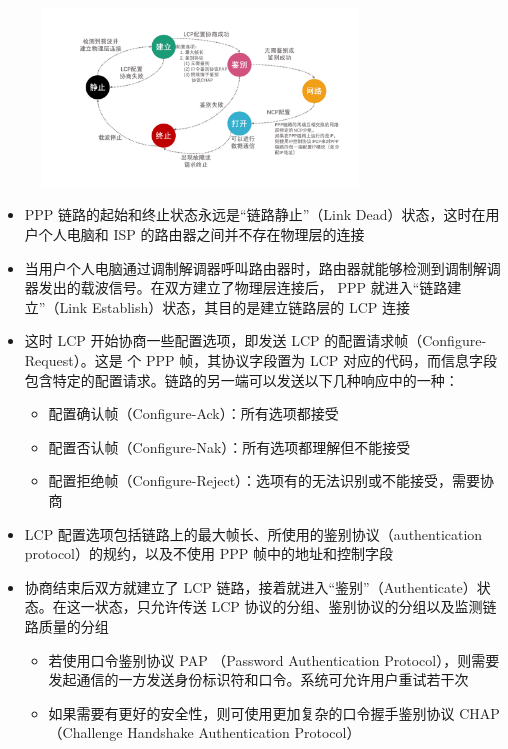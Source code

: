 \documentclass[cs4size,a4paper,10pt]{ctexart}
\begin{document}
	\begin{figure}[H]
		\centering
		\includegraphics[width=0.75\textwidth]{img/3.3.3}
	\end{figure}

	\begin{itemize}
		\item PPP 链路的起始和终止状态永远是“链路静止”（Link Dead）状态，这时在用户个人电脑和 ISP 的路由器之间并不存在物理层的连接
		\item 当用户个人电脑通过调制解调器呼叫路由器时，路由器就能够检测到调制解调器发出的载波信号。在双方建立了物理层连接后， PPP 就进入“链路建立”（Link Establish）状态，其目的是建立链路层的 LCP 连接
		\item 这时 LCP 开始协商一些配置选项，即发送 LCP 的配置请求帧（Configure-Request）。这是 个 PPP 帧，其协议字段置为 LCP 对应的代码，而信息字段包含特定的配置请求。链路的另一端可以发送以下几种响应中的一种：
		\begin{itemize}
			\item 配置确认帧（Configure-Ack）：所有选项都接受
			\item 配置否认帧（Configure-Nak）：所有选项都理解但不能接受
			\item 配置拒绝帧（Configure-Reject）：选项有的无法识别或不能接受，需要协商
		\end{itemize}
		\item LCP 配置选项包括链路上的最大帧长、所使用的鉴别协议（authentication protocol）的规约，以及不使用 PPP 帧中的地址和控制字段
		\item 协商结束后双方就建立了 LCP 链路，接着就进入“鉴别”（Authenticate）状态。在这一状态，只允许传送 LCP 协议的分组、鉴别协议的分组以及监测链路质量的分组
		\begin{itemize}
			\item 若使用口令鉴别协议 PAP （Password Authentication Protocol），则需要发起通信的一方发送身份标识符和口令。系统可允许用户重试若干次
			\item 如果需要有更好的安全性，则可使用更加复杂的口令握手鉴别协议 CHAP（Challenge Handshake Authentication Protocol）

\end{itemize}
\end{itemize}
\end{document}
